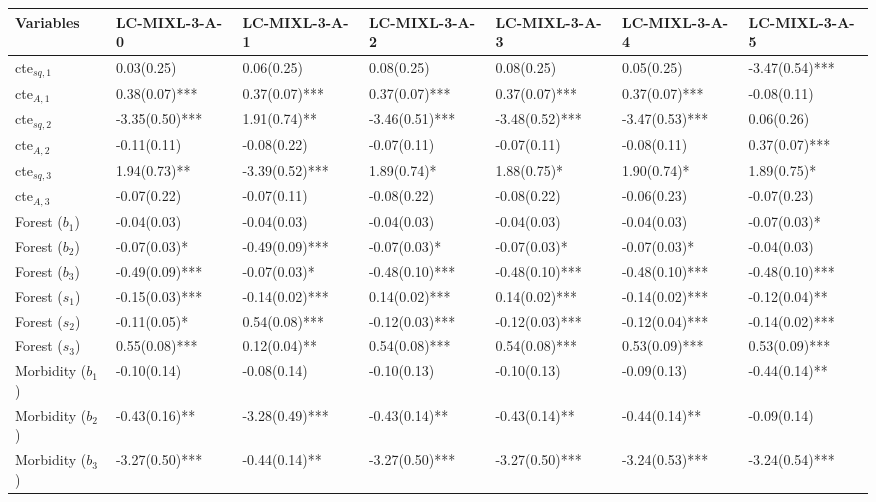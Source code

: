 \begin{tabular}{lllllll}
  \hline
Variables & LC-MIXL-3-A-0 & LC-MIXL-3-A-1 & LC-MIXL-3-A-2 & LC-MIXL-3-A-3 & LC-MIXL-3-A-4 & LC-MIXL-3-A-5 \\ 
  \hline
cte$_{sq,1}$ &  0.03(0.25)    &  0.06(0.25)    &  0.08(0.25)    &  0.08(0.25)    &  0.05(0.25)    & -3.47(0.54)*** \\ 
  cte$_{A ,1}$ &  0.38(0.07)*** &  0.37(0.07)*** &  0.37(0.07)*** &  0.37(0.07)*** &  0.37(0.07)*** & -0.08(0.11)    \\ 
  cte$_{sq,2}$ & -3.35(0.50)*** &  1.91(0.74)**  & -3.46(0.51)*** & -3.48(0.52)*** & -3.47(0.53)*** &  0.06(0.26)    \\ 
  cte$_{A ,2}$ & -0.11(0.11)    & -0.08(0.22)    & -0.07(0.11)    & -0.07(0.11)    & -0.08(0.11)    &  0.37(0.07)*** \\ 
  cte$_{sq,3}$ &  1.94(0.73)**  & -3.39(0.52)*** &  1.89(0.74)*   &  1.88(0.75)*   &  1.90(0.74)*   &  1.89(0.75)*   \\ 
  cte$_{A ,3}$ & -0.07(0.22)    & -0.07(0.11)    & -0.08(0.22)    & -0.08(0.22)    & -0.06(0.23)    & -0.07(0.23)    \\ 
  Forest  ($b_1$) & -0.04(0.03)    & -0.04(0.03)    & -0.04(0.03)    & -0.04(0.03)    & -0.04(0.03)    & -0.07(0.03)*   \\ 
  Forest  ($b_2$) & -0.07(0.03)*   & -0.49(0.09)*** & -0.07(0.03)*   & -0.07(0.03)*   & -0.07(0.03)*   & -0.04(0.03)    \\ 
  Forest  ($b_3$) & -0.49(0.09)*** & -0.07(0.03)*   & -0.48(0.10)*** & -0.48(0.10)*** & -0.48(0.10)*** & -0.48(0.10)*** \\ 
  Forest  ($s_1$) & -0.15(0.03)*** & -0.14(0.02)*** &  0.14(0.02)*** &  0.14(0.02)*** & -0.14(0.02)*** & -0.12(0.04)**  \\ 
  Forest  ($s_2$) & -0.11(0.05)*   &  0.54(0.08)*** & -0.12(0.03)*** & -0.12(0.03)*** & -0.12(0.04)*** & -0.14(0.02)*** \\ 
  Forest  ($s_3$) &  0.55(0.08)*** &  0.12(0.04)**  &  0.54(0.08)*** &  0.54(0.08)*** &  0.53(0.09)*** &  0.53(0.09)*** \\ 
  Morbidity ($b_1$) & -0.10(0.14)    & -0.08(0.14)    & -0.10(0.13)    & -0.10(0.13)    & -0.09(0.13)    & -0.44(0.14)**  \\ 
  Morbidity ($b_2$) & -0.43(0.16)**  & -3.28(0.49)*** & -0.43(0.14)**  & -0.43(0.14)**  & -0.44(0.14)**  & -0.09(0.14)    \\ 
  Morbidity ($b_3$) & -3.27(0.50)*** & -0.44(0.14)**  & -3.27(0.50)*** & -3.27(0.50)*** & -3.24(0.53)*** & -3.24(0.54)*** \\ 

\end{tabular}
